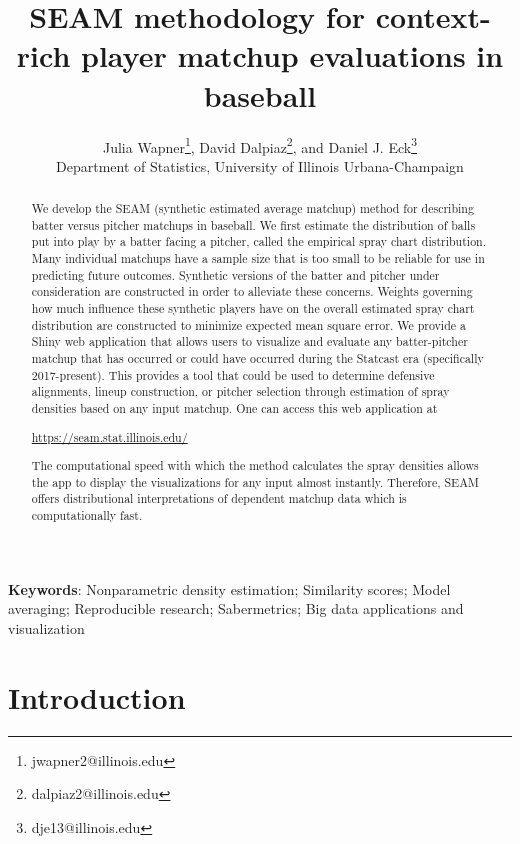 \documentclass[12pt]{article}
\title{SEAM methodology for context-rich player matchup evaluations in baseball}
\author{Julia Wapner\thanks{jwapner2@illinois.edu}, 
David Dalpiaz\thanks{dalpiaz2@illinois.edu},
and Daniel J. Eck\thanks{dje13@illinois.edu} \\[1em]
Department of Statistics, University of Illinois Urbana-Champaign
}
\date{}
\begin{document}
\maketitle

\begin{abstract}
We develop the SEAM (synthetic estimated average matchup) method for describing batter versus pitcher matchups in baseball. We first estimate the distribution of balls put into play by a batter facing a pitcher, called the empirical spray chart distribution. Many individual matchups have a sample size that is too small to be reliable for use in predicting future outcomes. Synthetic versions of the batter and pitcher under consideration are constructed in order to alleviate these concerns. Weights governing how much influence these synthetic players have on the overall estimated spray chart distribution are constructed to minimize expected mean square error. We provide a Shiny web application that allows users to visualize and evaluate any batter-pitcher matchup that has occurred or could have occurred during the Statcast era (specifically 2017-present). This provides a tool that could be used to determine defensive alignments, lineup construction, or pitcher selection through estimation of spray densities based on any input matchup. One can access this web application at \begin{center}
\url{https://seam.stat.illinois.edu/}
\end{center} 
The computational speed with which the method calculates the spray densities allows the app to display the visualizations for any input almost instantly. Therefore, SEAM offers distributional interpretations of dependent matchup data which is computationally fast.
\end{abstract}

\noindent\textbf{Keywords}: Nonparametric density estimation; Similarity scores; Model averaging; Reproducible research; Sabermetrics; Big data applications and visualization


\section{Introduction}
\end{document}
